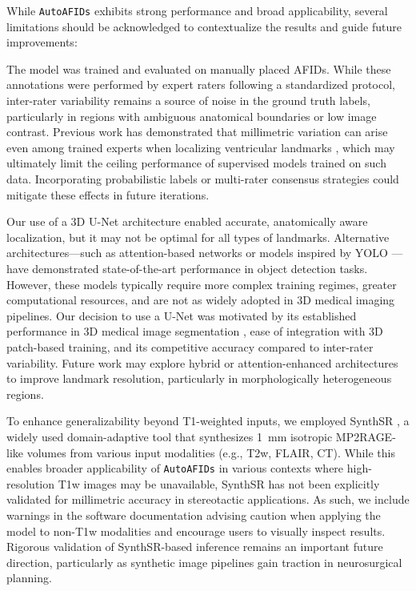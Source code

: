 While \texttt{AutoAFIDs} exhibits strong performance and broad applicability, several limitations should be acknowledged to contextualize the results and guide future improvements:

The model was trained and evaluated on manually placed AFIDs. While these annotations were performed by expert raters following a standardized protocol, inter-rater variability remains a source of noise in the ground truth labels, particularly in regions with ambiguous anatomical boundaries or low image contrast. Previous work has demonstrated that millimetric variation can arise even among trained experts when localizing ventricular landmarks \cite{Lau2019-eh,Abbass2022-lf}, which may ultimately limit the ceiling performance of supervised models trained on such data. Incorporating probabilistic labels or multi-rater consensus strategies could mitigate these effects in future iterations.

Our use of a 3D U-Net architecture enabled accurate, anatomically aware localization, but it may not be optimal for all types of landmarks. Alternative architectures—such as attention-based networks or models inspired by YOLO \cite{Redmon2015-ia}—have demonstrated state-of-the-art performance in object detection tasks. However, these models typically require more complex training regimes, greater computational resources, and are not as widely adopted in 3D medical imaging pipelines. Our decision to use a U-Net was motivated by its established performance in 3D medical image segmentation \cite{Cicek2016-dz}, ease of integration with 3D patch-based training, and its competitive accuracy compared to inter-rater variability. Future work may explore hybrid or attention-enhanced architectures to improve landmark resolution, particularly in morphologically heterogeneous regions.

To enhance generalizability beyond T1-weighted inputs, we employed SynthSR \cite{Iglesias2023-co}, a widely used domain-adaptive tool that synthesizes 1~mm isotropic MP2RAGE-like volumes from various input modalities (e.g., T2w, FLAIR, CT). While this enables broader applicability of \texttt{AutoAFIDs} in various contexts where high-resolution T1w images may be unavailable, SynthSR has not been explicitly validated for millimetric accuracy in stereotactic applications. As such, we include warnings in the software documentation advising caution when applying the model to non-T1w modalities and encourage users to visually inspect results. Rigorous validation of SynthSR-based inference remains an important future direction, particularly as synthetic image pipelines gain traction in neurosurgical planning.

